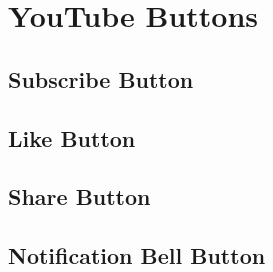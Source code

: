 \chapter{YouTube Buttons}
\section{Subscribe Button}

\section{Like Button}

\section{Share Button}

\section{Notification Bell Button}

